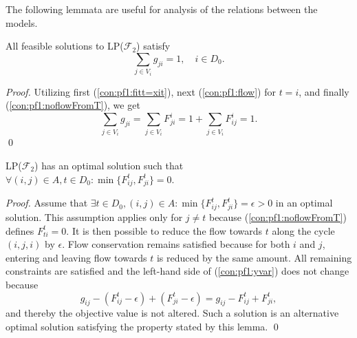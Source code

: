 The following lemmata are useful for analysis of the relations between the models. 
\begin{lemma}\label{lem:sumxji1}
All feasible solutions to LP($\mathcal{F}_2$) satisfy
\begin{equation}
\sum_{j\in V_i}g_{ji}=1,\quad i\in D_0.  \label{eq:sumToD} 
\end{equation}
\end{lemma}
\begin{proof}
 Utilizing first (\ref{con:pf1:fitt=xit}), next (\ref{con:pf1:flow}) for $t=i$, and finally (\ref{con:pf1:noflowFromT}), we get
$$\sum_{j\in V_i}g_{ji}=\sum_{j\in V_i}F_{ji}^i = 1+\sum_{j\in V_i}F_{ij}^i=1.$$\qed
\end{proof}
\begin{lemma}\label{lem:onedir} LP($\mathcal{F}_2$) has an optimal solution such that \newline
$\forall (i,j)\in A, t\in D_0: \min\{F^t_{ij},F^t_{ji}\} = 0.$
\end{lemma}
\begin{proof}
Assume that $\exists t\in D_0, (i,j)\in A: \min\{F^t_{ij},F^t_{ji}\} = \epsilon> 0$ in an optimal solution.
This assumption applies only for $j\neq t$ because (\ref{con:pf1:noflowFromT}) defines $F^t_{ti}=0$.
It is then possible to reduce the flow towards $t$ along the cycle $(i,j,i)$ by $\epsilon$.
Flow conservation remains satisfied because for both $i$ and $j$, entering and leaving flow towards $t$ is reduced by the same amount.
All remaining constraints are satisfied and the left-hand side of (\ref{con:pf1:yvar}) does not change because 
$$
g_{ij}-(F^t_{ij}-\epsilon)+(F^t_{ji}-\epsilon) = g_{ij}-F^t_{ij}+F^t_{ji},
$$
and thereby the objective value is not altered. Such a solution is an alternative optimal solution satisfying the property stated by this lemma.  \qed
\end{proof}
